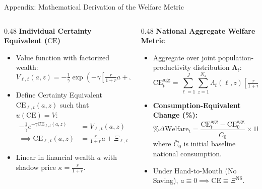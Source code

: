 \documentclass[aspectratio=169, 10pt]{beamer}
\begin{document}
\begin{frame}{Appendix: Mathematical Derivation of the Welfare Metric \hfill \hyperlink{main:synthesis}{\scriptsize{}}}\label{backup:welfare_metric}
    \begin{columns}[T]
        \begin{column}{0.48\textwidth}
            \textbf{\small Individual Certainty Equivalent ($\text{CE}$)}
            \vspace{0.04cm}
            \begin{itemize}\scriptsize\setlength{\itemsep}{2pt}
                \item Value function with factorized wealth:
                $$V_{\ell,t}(a, z) = -\tfrac{1}{\gamma} \exp\left(-\gamma \left[\tfrac{r}{1+r} a + \Xi_{\ell,t}(z)\right]\right)$$
                \item Define Certainty Equivalent $\text{CE}_{\ell,t}(a,z)$ such that $u(\text{CE}) = V$:
                \begin{align*}
                -\tfrac{1}{\gamma} e^{-\gamma \text{CE}_{\ell,t}(a,z)} &= V_{\ell,t}(a,z) \\
                \implies \text{CE}_{\ell,t}(a, z) &= \tfrac{r}{1+r} a + \Xi_{\ell,t}(z)
                \end{align*}
                \item Linear in financial wealth $a$ with shadow price $\kappa = \frac{r}{1+r}$.
            \end{itemize}
        \end{column}
        \begin{column}{0.48\textwidth}
            \textbf{\small National Aggregate Welfare Metric}
            \vspace{0.04cm}
            \begin{itemize}\scriptsize\setlength{\itemsep}{2pt}
                \item Aggregate over joint population-productivity distribution $\boldsymbol{\Lambda}_t$:
                $$\text{CE}_t^{\text{agg}} = \sum_{\ell=1}^J \sum_{z=1}^{N_z} \Lambda_t(\ell, z) \left[ \tfrac{r}{1+r} \bar{a}_t(\ell, z) + \Xi_{\ell,t}(z) \right]$$
                \item \textbf{Consumption-Equivalent Change (\%):}
                $$\% \Delta \text{Welfare}_t = \frac{\text{CE}_t^{\text{agg}} - \text{CE}_0^{\text{agg}}}{\bar{C}_0} \times 100\%$$
                where $\bar{C}_0$ is initial baseline national consumption.
                \item Under Hand-to-Mouth (No Saving), $a \equiv 0 \implies \text{CE} \equiv \Xi^{\text{NS}}$.
            \end{itemize}
        \end{column}
    \end{columns}
\end{frame}
\end{document}
